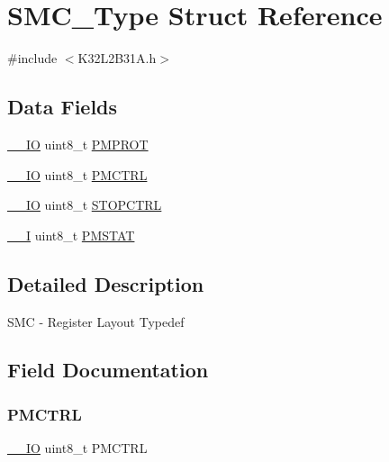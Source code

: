 \hypertarget{struct_s_m_c___type}{}\section{S\+M\+C\+\_\+\+Type Struct Reference}
\label{struct_s_m_c___type}


{\ttfamily \#include $<$K32\+L2\+B31\+A.\+h$>$}

\subsection*{Data Fields}
\begin{DoxyCompactItemize}
\item 
\mbox{\hyperlink{core__cm0plus_8h_aec43007d9998a0a0e01faede4133d6be}{\+\_\+\+\_\+\+IO}} uint8\+\_\+t \mbox{\hyperlink{struct_s_m_c___type_ab80b0e0bb4c1aa3e20de93cee5828603}{P\+M\+P\+R\+OT}}
\item 
\mbox{\hyperlink{core__cm0plus_8h_aec43007d9998a0a0e01faede4133d6be}{\+\_\+\+\_\+\+IO}} uint8\+\_\+t \mbox{\hyperlink{struct_s_m_c___type_a96fa5644eba54c5bf0a4c5c16ad4f6f7}{P\+M\+C\+T\+RL}}
\item 
\mbox{\hyperlink{core__cm0plus_8h_aec43007d9998a0a0e01faede4133d6be}{\+\_\+\+\_\+\+IO}} uint8\+\_\+t \mbox{\hyperlink{struct_s_m_c___type_a758faafc20c20806df9267730ac4bd6a}{S\+T\+O\+P\+C\+T\+RL}}
\item 
\mbox{\hyperlink{core__cm0plus_8h_af63697ed9952cc71e1225efe205f6cd3}{\+\_\+\+\_\+I}} uint8\+\_\+t \mbox{\hyperlink{struct_s_m_c___type_ad38d8d9691e23bb395d7b9030040693a}{P\+M\+S\+T\+AT}}
\end{DoxyCompactItemize}


\subsection{Detailed Description}
S\+MC -\/ Register Layout Typedef 

\subsection{Field Documentation}
\mbox{\label{struct_s_m_c___type_a96fa5644eba54c5bf0a4c5c16ad4f6f7}} 
\subsubsection{\texorpdfstring{PMCTRL}{PMCTRL}}
{\footnotesize\ttfamily \mbox{\hyperlink{core__cm0plus_8h_aec43007d9998a0a0e01faede4133d6be}{\+\_\+\+\_\+\+IO}} uint8\+\_\+t P\+M\+C\+T\+RL}

